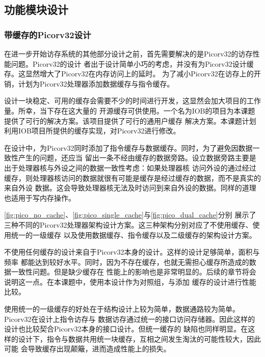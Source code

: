 \subsection{功能模块设计}
\label{section:design_module}

\subsubsection{带缓存的Picorv32设计}

在进一步开始访存系统的其他部分设计之前，首先需要解决的是Picorv32的访存性能问题。Picorv32的设计
者出于设计简单小巧的考虑，并没有为Picorv32设计缓存。这显然增大了Picorv32在内存访问上的延时。
为了减小Picorv32在访存上的开销，计划为Picorv32处理器添加数据缓存与指令缓存。

设计一块稳定、可用的缓存会需要不少的时间进行开发，这显然会加大项目的工作量。所幸，当下存在这大量的
开源缓存可供使用。一个名为IOB的项目为本课题提供了可行的解决方案\cite{roque2021iob}。该项目提供了可行的通用户缓存
解决方案。本课题计划利用IOB项目所提供的缓存实现，对Picorv32进行修改。

在设计中，为Picorv32同时添加了指令缓存与数据缓存。同时，为了避免因数据一致性产生的问题，还应当
留出一条不经由缓存的数据旁路。设立数据旁路主要是出于处理器核与外设之间的数据一致性考虑：如果处理器核
访问外设的通过经过缓存，则处理器核访问的数据就很有可能是缓存是经过缓存的数据，而不是真实的来自外设
数据。这会导致处理器核无法及时访问到来自外设的数据。同样的道理也适用于写内存操作。




\autoref{fig:pico_no_cache}、\autoref{fig:pico_single_cache}与\autoref{fig:pico_dual_cache}分别
展示了三种不同的Picorv32处理器架构设计方案。这三种架构分别对应了不使用缓存、使用统一的一级缓存
以及使用数据缓存、指令缓存以及二级缓存的架构设计方案。

不使用任何缓存的设计来自于Picorv32本身的设计\cite{picorv32}。这样的设计足够简单，面积与频率
都能达到较好水平。同时，因为不存在缓存，也就无需担心缓存所造成的数据一致性问题。但是缺少缓存在
性能上的影响也是非常明显的。后续的章节将会说明这一点。在本课题中，使用本设计作为对照组，与添加
缓存的设计进行性能比较。

使用统一的一级缓存的好处在于结构设计上较为简单，数据通路较为简单。Picorv32在设计上指令访存与
数据访存通过统一的接口访问存储器。因此这样的设计也比较契合Picorv32本身的接口设计。但统一缓存的
缺陷也同样明显。在这样的设计下，指令与数据共用统一块缓存，互相之间发生淘汰的可能性较大，因此可能
会导致缓存出现颠簸，进而造成性能上的损失。

